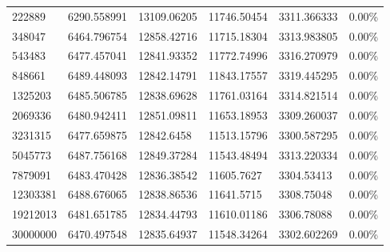 \documentclass[12pt]{article} %
\begin{document}
\begin{table}[]
{\begin{tabular}{@{}llllll@{}}
222889 & 6290.558991 & 13109.06205 & 11746.50454 & 3311.366333 & 0.00\% \\
348047 & 6464.796754 & 12858.42716 & 11715.18304 & 3313.983805 & 0.00\% \\
543483 & 6477.457041 & 12841.93352 & 11772.74996 & 3316.270979 & 0.00\% \\
848661 & 6489.448093 & 12842.14791 & 11843.17557 & 3319.445295 & 0.00\% \\
1325203 & 6485.506785 & 12838.69628 & 11761.03164 & 3314.821514 & 0.00\% \\
2069336 & 6480.942411 & 12851.09811 & 11653.18953 & 3309.260037 & 0.00\% \\
3231315 & 6477.659875 & 12842.6458 & 11513.15796 & 3300.587295 & 0.00\% \\
5045773 & 6487.756168 & 12849.37284 & 11543.48494 & 3313.220334 & 0.00\% \\
7879091 & 6483.470428 & 12836.38542 & 11605.7627 & 3304.53413 & 0.00\% \\
12303381 & 6488.676065 & 12838.86536 & 11641.5715 & 3308.75048 & 0.00\% \\
19212013 & 6481.651785 & 12834.44793 & 11610.01186 & 3306.78088 & 0.00\% \\
30000000 & 6470.497548 & 12835.64937 & 11548.34264 & 3302.602269 & 0.00\% \\ \bottomrule
\end{tabular}%
}
\end{table}
\end{document}
